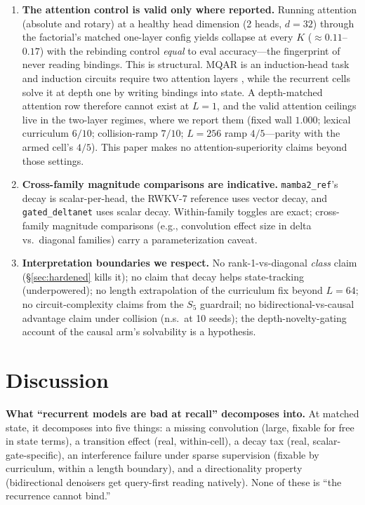 \documentclass{article}
\newcommand{\gdn}{\texttt{gated\_deltanet}}
\newcommand{\mambaref}{\texttt{mamba2\_ref}}
\begin{document}
\begin{enumerate}[leftmargin=1.4em,itemsep=2pt]
\item \textbf{The attention control is valid only where reported.} Running attention (absolute and rotary) at a healthy head dimension (2 heads, $d{=}32$) through the factorial's matched one-layer config yields collapse at every $K$ (${\approx}0.11$--$0.17$) with the rebinding control \emph{equal} to eval accuracy---the fingerprint of never reading bindings. This is structural. MQAR is an induction-head task and induction circuits require two attention layers \citep{olsson2022induction}, while the recurrent cells solve it at depth one by writing bindings into state. A depth-matched attention row therefore cannot exist at $L{=}1$, and the valid attention ceilings live in the two-layer regimes, where we report them (fixed wall $1.000$; lexical curriculum $6/10$; collision-ramp $7/10$; $L{=}256$ ramp $4/5$---parity with the armed cell's $4/5$). This paper makes no attention-superiority claims beyond those settings.
\item \textbf{Cross-family magnitude comparisons are indicative.} \mambaref{}'s decay is scalar-per-head, the RWKV-7 reference uses vector decay, and \gdn{} uses scalar decay. Within-family toggles are exact; cross-family magnitude comparisons (e.g., convolution effect size in delta vs.\ diagonal families) carry a parameterization caveat.
\item \textbf{Interpretation boundaries we respect.} No rank-1-vs-diagonal \emph{class} claim (\S\ref{sec:hardened} kills it); no claim that decay helps state-tracking (underpowered); no length extrapolation of the curriculum fix beyond $L{=}64$; no circuit-complexity claims from the $S_5$ guardrail; no bidirectional-vs-causal advantage claim under collision (n.s.\ at 10 seeds); the depth-novelty-gating account of the causal arm's solvability is a hypothesis.
\end{enumerate}

\section{Discussion}\label{sec:discussion}

\textbf{What ``recurrent models are bad at recall'' decomposes into.} At matched state, it decomposes into five things: a missing convolution (large, fixable for free in state terms), a transition effect (real, within-cell), a decay tax (real, scalar-gate-specific), an interference failure under sparse supervision (fixable by curriculum, within a length boundary), and a directionality property (bidirectional denoisers get query-first reading natively). None of these is ``the recurrence cannot bind.''
\end{document}
